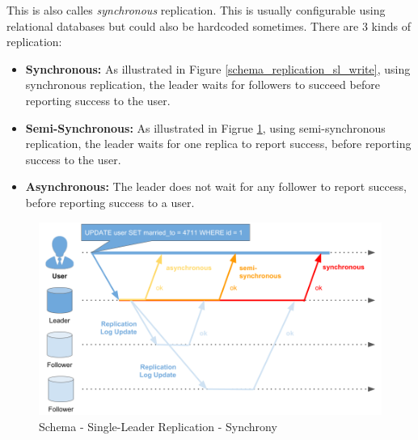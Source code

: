 {This is also calles \textit{synchronous} replication. This is usually configurable using relational databases but could also be hardcoded sometimes. There are 3 kinds of replication:\\
\begin{itemize}
\item \textbf{Synchronous:} As illustrated in Figure \ref{schema_replication_sl_write}, using synchronous replication, the leader waits for followers to succeed before reporting success to the user.
\item \textbf{Semi-Synchronous:} As illustrated in Figrue \ref{schema_replication_sl_synchronous}, using semi-synchronous replication, the leader waits for one replica to report success, before reporting success to the user.
\item \textbf{Asynchronous:} The leader does not wait for any follower to report success, before reporting success to a user.\\
\end{itemize}

\begin{figure}[H]
	\centering
  \includegraphics[width=1\textwidth]{replication_schema_sl_synchronous.png}
	\caption{Schema - Single-Leader Replication - Synchrony}
	\label{schema_replication_sl_synchronous}
\end{figure}

}
